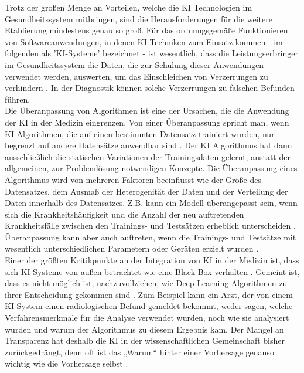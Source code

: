 Trotz der großen Menge an Vorteilen, welche die KI Technologien im Gesundheitssystem mitbringen, sind die Herausforderungen für die weitere Etablierung mindestens genau so groß. Für das ordnungsgemäße Funktionieren von Softwareanwendungen, in denen KI Techniken zum Einsatz kommen - im folgenden als 'KI-Systeme' bezeichnet - ist wesentlich, dass die Leistungserbringer im Gesundheitssystem die Daten, die zur Schulung dieser Anwendungen verwendet werden, auswerten, um das Einschleichen von Verzerrungen zu verhindern \cite{Chapter_14}. In der Diagnostik können solche Verzerrungen zu falschen Befunden führen.\\
Die Überanpassung von Algorithmen ist eine der Ursachen, die die Anwendung der KI in der Medizin eingrenzen. Von einer Überanpassung spricht man, wenn KI Algorithmen, die auf einen bestimmten Datensatz trainiert wurden, nur begrenzt auf andere Datensätze anwendbar sind \cite{AI_where_are_we_now}. Der KI Algorithmus hat dann ausschließlich die statischen Variationen der Trainingsdaten gelernt, anstatt der allgemeinen, zur Problemlösung notwendigen Konzepte. Die Überanpassung eines Algorithmus wird von mehreren Faktoren beeinflusst wie der Größe des Datensatzes, dem Ausmaß der Heterogenität der Daten und der Verteilung der Daten innerhalb des Datensatzes. Z.B. kann ein Modell überangepasst sein, wenn sich die Krankheitshäufigkeit und die Anzahl der neu auftretenden Krankheitsfälle zwischen den Trainings- und Testsätzen erheblich unterscheiden \cite{AI_where_are_we_now}. Überanpassung kann aber auch auftreten, wenn die Trainings- und Testsätze mit wesentlich unterschiedlichen Parametern oder Geräten erzielt wurden \cite{AI_where_are_we_now}.\\
Einer der größten Kritikpunkte an der Integration von KI in der Medizin ist, dass sich KI-Systeme von außen betrachtet wie eine Black-Box verhalten \cite{The_missing_pieces}. Gemeint ist, dass es nicht möglich ist, nachzuvollziehen, wie Deep Learning Algorithmen zu ihrer Entscheidung gekommen sind \cite{The_missing_pieces}. Zum Beispiel kann ein Arzt, der von einem KI-System einen radiologischen Befund gemeldet bekommt, weder sagen, welche Verfahrensmerkmale für die Analyse verwendet wurden, noch wie sie analysiert wurden und warum der Algorithmus zu diesem Ergebnis kam\cite{The_missing_pieces}. Der Mangel an Transparenz hat deshalb die KI in der wissenschaftlichen Gemeinschaft bisher zurückgedrängt, denn oft ist das „Warum“ hinter einer Vorhersage genauso wichtig wie die Vorhersage selbst \cite{The_missing_pieces}.\\
